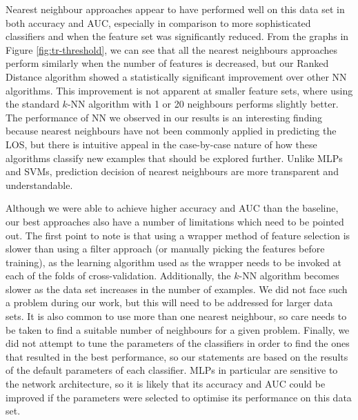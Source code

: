 \documentclass{article}
\begin{document}
Nearest neighbour approaches appear to have performed well on this data set in
both accuracy and AUC, especially in comparison to more sophisticated
classifiers and when the feature set was significantly reduced. From the graphs
in Figure \ref{fig:tr-threshold}, we can see that all the nearest neighbours
approaches perform similarly when the number of features is decreased, but our
Ranked Distance algorithm showed a statistically significant improvement over
other NN algorithms. This
improvement is not apparent at smaller feature sets, where using the standard
$k$-NN algorithm with 1 or 20 neighbours performs slightly better.
The performance of NN we observed in our results is
an interesting finding because nearest neighbours have not been commonly
applied in predicting the LOS, but there is intuitive appeal in the
case-by-case nature of how these algorithms classify new examples that should
be explored further. Unlike MLPs and SVMs, prediction decision of nearest
neighbours are more transparent and understandable.

Although we were able to achieve higher accuracy and AUC than the baseline,
our best approaches also have a number of limitations which need to be pointed
out. The first point to note is that using a wrapper method of feature
selection is slower than using a filter approach (or manually picking the
features before training), as the learning algorithm used as the wrapper
needs to be invoked at each of the folds of cross-validation. Additionally,
the $k$-NN algorithm becomes slower as the data set increases in the number
of examples. We did not face such a problem during our work, but this will
need to be addressed for larger data sets. It is also common to use more
than one nearest neighbour, so care needs to be taken to find a suitable number
of neighbours for a given problem. Finally, we did not
attempt to tune the parameters of the classifiers in order to find the ones
that resulted in the best performance, so our statements are based on the
results of the default parameters of each classifier.
MLPs in particular are sensitive to
the network architecture, so it is likely that its accuracy and AUC could be
improved if the parameters were selected to optimise its performance on this
data set.
\end{document}
